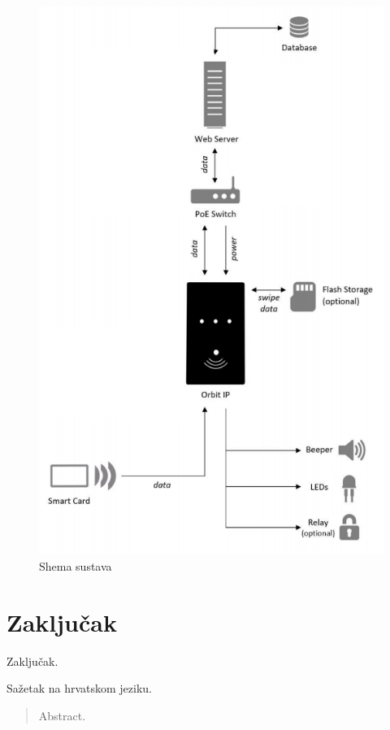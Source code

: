 \documentclass[times, utf8, zavrsni]{fer}
\begin{document}
\begin{figure}[h]
\includegraphics[scale=0.5]{arhitektura.png}
\centering
\caption{Shema sustava}
\centering
\end{figure}

\chapter{Zaključak}
Zaključak.




\begin{sazetak}
Sažetak na hrvatskom jeziku.

\end{sazetak}

\begin{abstract}
Abstract.

\end{abstract}
\end{document}
